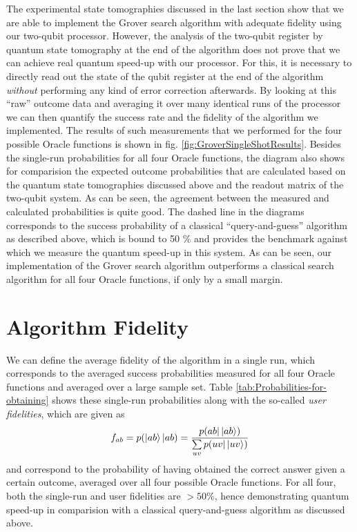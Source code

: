 The experimental state tomographies discussed in the last section show that we are able to implement the Grover search algorithm with adequate fidelity using our two-qubit processor. However, the analysis of the two-qubit register by quantum state tomography at the end of the algorithm does not prove that we can achieve real quantum speed-up with our processor. For this, it is necessary to directly read out the state of the qubit register at the end of the algorithm {\it without} performing any kind of error correction afterwards. By looking at this ``raw'' outcome data and averaging it over many identical runs of the processor we can then quantify the success rate and the fidelity of the algorithm we implemented. The results of such measurements that we performed for the four possible Oracle functions is shown in fig. \ref{fig:GroverSingleShotResults}. Besides the single-run probabilities for all four Oracle functions, the diagram also shows for comparision the expected outcome probabilities that are calculated based on the quantum state tomographies discussed above and the readout matrix of the two-qubit system. As can be seen, the agreement between the measured and calculated probabilities is quite good. The dashed line in the diagrams corresponds to the success probability of a classical ``query-and-guess'' algorithm as described above, which is bound to 50 \% and provides the benchmark against which we measure the quantum speed-up in this system. As can be seen, our implementation of the Grover search algorithm outperforms a classical search algorithm for all four Oracle functions, if only by a small margin.

\section{Algorithm Fidelity}

We can define the average fidelity of the algorithm in a single run, which corresponds to the averaged success probabilities measured for all four Oracle functions and averaged over a large sample set. Table \ref{tab:Probabilities-for-obtaining} shows these single-run probabilities along with the so-called {\it user fidelities}, which are given as
%
\begin{equation}
f_{ab} = p(\left| ab \right>|ab) = \frac{p(ab |\left| ab \right>)}{\sum\limits_{uv}p(uv|\left| uv \right>)} 
\end{equation}
%
and correspond to the probability of having obtained the correct answer given a certain outcome, averaged over all four possible Oracle functions. For all four, both the single-run and user fidelities are $> 50 \%$, hence demonstrating quantum speed-up in comparision with a classical query-and-guess algorithm as discussed above.


